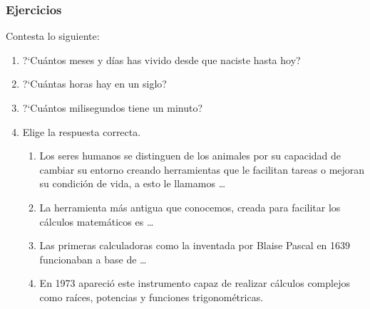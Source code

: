 \documentclass[11pt]{book}
\begin{document}
\newpage
\subsubsection{Ejercicios}
Contesta lo siguiente:

\begin{enumerate}
    \item ?`Cu\'antos meses y d\'ias has vivido desde que naciste hasta hoy?
    \item ?`Cu\'antas horas hay en un siglo?
    \item ?`Cu\'antos milisegundos tiene un minuto?

    \item Elige la respuesta correcta.
          \begin{enumerate}
              \item Los seres humanos se distinguen de los animales por su capacidad de
                    cambiar su entorno creando herramientas que le facilitan tareas o mejoran su
                    condici\'on de vida, a esto le llamamos \dots

              \item La herramienta m\'as antigua que conocemos, creada para facilitar los
                    c\'alculos matem\'aticos es \dots

              \item Las primeras calculadoras como la inventada por Blaise Pascal en 1639
                    funcionaban a base de \dots

              \item  En 1973 apareci\'o este instrumento capaz de realizar c\'alculos
                    complejos como ra\'ices, potencias y  funciones trigonom\'etricas.


\end{enumerate}
\end{enumerate}
\end{document}
